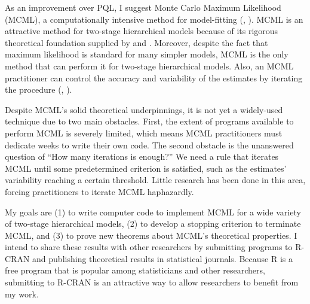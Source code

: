 \documentclass[12pt]{article}
\newcommand{\ncite}[1]{\citeauthor{#1}, \citeyear{#1}}
\begin{document}
As an improvement over PQL, I suggest  Monte Carlo Maximum Likelihood (MCML), a computationally intensive method for model-fitting (\ncite{geyer:thom:1992}). MCML is an attractive method for two-stage hierarchical models because of its rigorous theoretical foundation supplied by \citet{geyer:1994} and  \citet{sung:geyer:2007}.   Moreover, despite the fact that maximum likelihood is standard for many simpler models, MCML is the only method that can perform  it for two-stage hierarchical models. Also, an MCML practitioner can control the accuracy and variability of the estimates  by iterating the  procedure (\ncite{geyer:thom:1992}). 



Despite MCML's solid theoretical underpinnings, it is not yet a widely-used technique due to two main obstacles. First, the extent of programs available to perform MCML is severely limited, which means MCML practitioners  must dedicate weeks to write their own code. 
The second obstacle is the unanswered question of ``How many iterations is enough?''  We need  a rule that iterates MCML until some predetermined criterion is satisfied, such as the estimates' variability reaching a certain threshold. Little research has been done in this area, forcing practitioners to iterate MCML haphazardly.

 


My goals are  (1) to write computer code to implement MCML for a wide variety of two-stage hierarchical models, (2) to develop a stopping criterion to terminate MCML, and (3) to prove new theorems about MCML's theoretical properties. I intend to share these results with other researchers by submitting programs to R-CRAN and publishing theoretical results in statistical journals.  Because R is a free  program that is popular among statisticians and other researchers, submitting to R-CRAN is an attractive way to allow researchers to benefit from my work.
\end{document}
